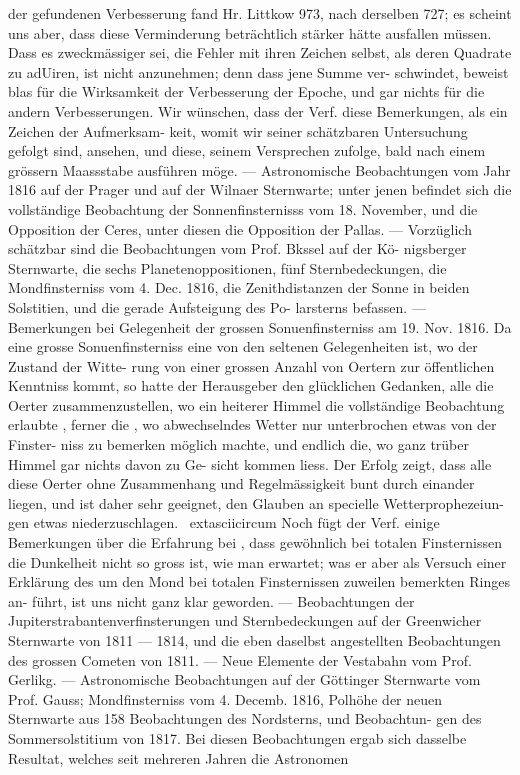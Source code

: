 \documentclass[12pt,a4paper]{article}
\begin{document}
{{{{{{{{der  gefundenen  Verbesserung  fand  Hr.  Littkow  973,  nach  derselben  727;  es  scheint  uns  aber,  dass  diese Verminderung  beträchtlich  stärker  hätte  ausfallen  müssen.  Dass  es  zweckmässiger  sei,  die  Fehler  mit ihren  Zeichen  selbst,  als  deren  Quadrate  zu  adUiren,  ist  nicht  anzunehmen;  denn  dass  jene  Summe  ver- schwindet, beweist  blas  für  die  Wirksamkeit  der  Verbesserung  der  Epoche,  und  gar  nichts  für  die  andern Verbesserungen.  Wir  wünschen,  dass  der  Verf.  diese  Bemerkungen,  als  ein  Zeichen  der  Aufmerksam- keit, womit  wir  seiner  schätzbaren  Untersuchung  gefolgt  sind,  ansehen,  und  diese,  seinem  Versprechen zufolge,  bald  nach  einem  grössern  Maassstabe  ausführen  möge.  ---  Astronomische  Beobachtungen  vom Jahr  1816  auf  der  Prager  und  auf  der  Wilnaer  Sternwarte;  unter  jenen  befindet  sich  die  vollständige Beobachtung  der  Sonnenfinsternisss  vom  18.  November,  und  die  Opposition  der  Ceres,  unter  diesen  die Opposition  der  Pallas.  ---  Vorzüglich  schätzbar  sind  die  Beobachtungen  vom  Prof.  Bkssel  auf  der  Kö- nigsberger Sternwarte,  die  sechs  Planetenoppositionen,  fünf  Sternbedeckungen,  die  Mondfinsterniss  vom 4.  Dec.  1816,  die  Zenithdistanzen  der  Sonne  in  beiden  Solstitien,  und  die  gerade  Aufsteigung  des  Po- larsterns befassen.  ---  Bemerkungen  bei  Gelegenheit  der  grossen  Sonuenfinsterniss  am  19.  Nov.  1816. Da  eine  grosse  Sonuenfinsterniss  eine  von  den  seltenen  Gelegenheiten  ist,  wo  der  Zustand  der  Witte- rung von  einer  grossen  Anzahl  von  Oertern  zur  öffentlichen  Kenntniss  kommt,  so  hatte  der  Herausgeber den  glücklichen  Gedanken,  alle  die  Oerter  zusammenzustellen,  wo  ein  heiterer  Himmel  die  vollständige Beobachtung  erlaubte ,  ferner  die ,  wo  abwechselndes  Wetter  nur  unterbrochen  etwas  von  der  Finster- niss  zu  bemerken  möglich  machte,  und  endlich  die,  wo  ganz  trüber  Himmel  gar  nichts  davon  zu  Ge- sicht kommen  liess.  Der  Erfolg  zeigt,  dass  alle  diese  Oerter  ohne  Zusammenhang  und  Regelmässigkeit bunt  durch  einander  liegen,  und  ist  daher  sehr  geeignet,  den  Glauben  an  specielle  Wetterprophezeiun- gen etwas  niederzuschlagen.  \	extasciicircum{}{ }  Noch  fügt  der  Verf.  einige  Bemerkungen  über  die  Erfahrung  bei ,  dass gewöhnlich  bei  totalen  Finsternissen  die  Dunkelheit  nicht  so  gross  ist,  wie  man  erwartet;  was  er  aber als  Versuch  einer  Erklärung  des  um  den  Mond  bei  totalen  Finsternissen  zuweilen  bemerkten  Ringes  an- führt, ist  uns  nicht  ganz  klar  geworden.  ---  Beobachtungen  der  Jupiterstrabantenverfinsterungen  und Sternbedeckungen  auf  der  Greenwicher  Sternwarte  von  1811  ---  1814,  und  die  eben  daselbst  angestellten Beobachtungen  des  grossen  Cometen  von  1811.  ---  Neue  Elemente  der  Vestabahn  vom  Prof.  Gerlikg. --- Astronomische  Beobachtungen  auf  der  Göttinger  Sternwarte  vom  Prof.  Gauss;  Mondfinsterniss  vom  4. Decemb.  1816,  Polhöhe  der  neuen  Sternwarte  aus  158  Beobachtungen  des  Nordsterns,  und  Beobachtun- gen des  Sommersolstitium  von  1817.  Bei  diesen  Beobachtungen  ergab  sich  dasselbe  Resultat,  welches seit  mehreren  Jahren  die  Astronomen  }}}}}}}}
\end{document}
